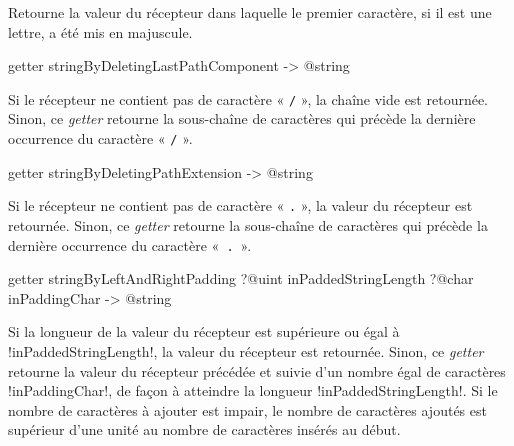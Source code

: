Retourne la valeur du récepteur dans laquelle le premier caractère, si il est une lettre, a été mis en majuscule.









\begin{galgasbox}
getter stringByDeletingLastPathComponent -> @string
\end{galgasbox}

Si le récepteur ne contient pas de caractère « \texttt{/} », la chaîne vide est retournée. Sinon, ce \emph{getter} retourne la sous-chaîne de caractères qui précède la dernière occurrence du caractère « \texttt{/} ».










\begin{galgasbox}
getter stringByDeletingPathExtension -> @string
\end{galgasbox}

Si le récepteur ne contient pas de caractère « \texttt{.} », la valeur du récepteur est retournée. Sinon, ce \emph{getter} retourne la sous-chaîne de caractères qui précède la dernière occurrence du caractère «~\texttt{.}~».









\begin{galgasbox}
getter stringByLeftAndRightPadding
   ?@uint inPaddedStringLength
   ?@char inPaddingChar -> @string
\end{galgasbox}

Si la longueur de la valeur du récepteur est supérieure ou égal à \ggs!inPaddedStringLength!, la valeur du récepteur est retournée. Sinon, ce \emph{getter} retourne la valeur du récepteur précédée et suivie d'un nombre égal de caractères \ggs!inPaddingChar!, de façon à atteindre la longueur \ggs!inPaddedStringLength!. Si le nombre de caractères à ajouter est impair, le nombre de caractères ajoutés est supérieur d'une unité au nombre de caractères insérés au début.








